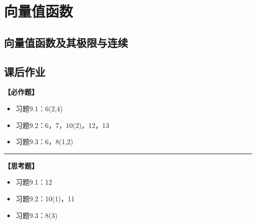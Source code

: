 \setcounter{chapter}{8}

\chapter{向量值函数}

\section{向量值函数及其极限与连续}






\newpage

\section*{课后作业}

{\bf 【必作题】}

\begin{itemize}
  \setlength{\itemindent}{1cm}
  \item 习题9.1：6(2,4)
  \item 习题9.2：6，7，10(2)，12，13
  \item 习题9.3：6，8(1,2)
\end{itemize}

\bigskip

\hrule

\bigskip

{\bf 【思考题】}

\begin{itemize}
  \setlength{\itemindent}{1cm}
  \item 习题9.1：12
  \item 习题9.2：10(1)，11
  \item 习题9.3：8(3)
\end{itemize}